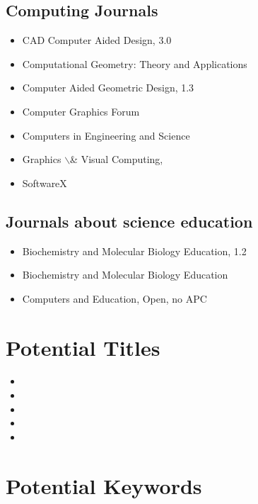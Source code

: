 \documentclass[11pt,letterpaper]{article}
\begin{document}
\subsection{Computing Journals}
\label{sec:orga1cccbe}

\begin{itemize}
\item CAD Computer Aided Design, 3.0
\item Computational Geometry: Theory and Applications
\item Computer Aided Geometric Design, 1.3
\item Computer Graphics Forum
\item Computers in Engineering and Science
\item Graphics $\backslash$& Visual Computing,
\item SoftwareX
\end{itemize}

\subsection{Journals about science education}
\label{sec:orgcc650f3}
\begin{itemize}
\item Biochemistry and Molecular Biology Education, 1.2
\item Biochemistry and Molecular Biology Education
\item Computers and Education, Open, no APC
\end{itemize}

\section{Potential Titles}
\label{sec:org8b6883e}

\begin{itemize}
\item 

\item 

\item 

\item 

\item 
\end{itemize}


\section{Potential Keywords}
\label{sec:orgf460696}
\end{document}
